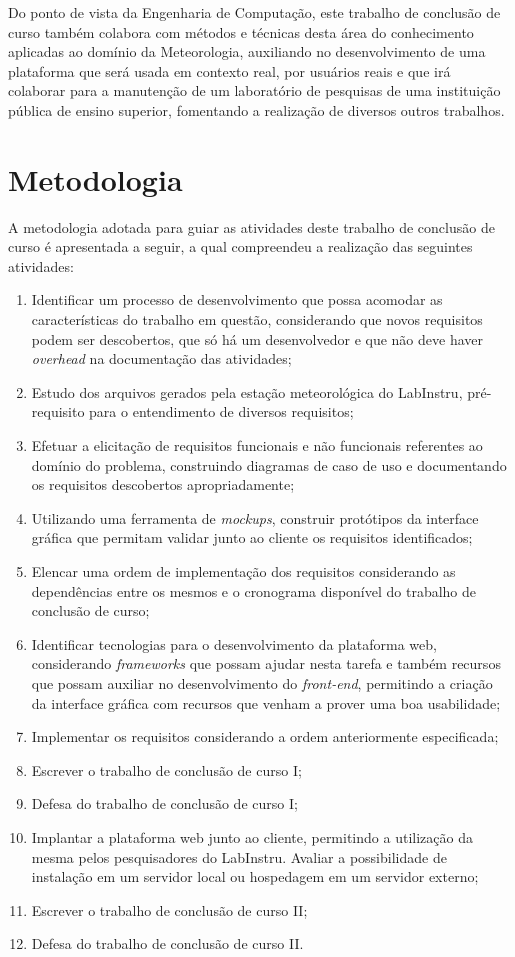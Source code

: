 Do ponto de vista da Engenharia de Computação, este trabalho de conclusão de curso também colabora com métodos e técnicas desta área do conhecimento aplicadas ao domínio da Meteorologia, auxiliando no desenvolvimento de uma plataforma que será usada em contexto real, por usuários reais e que irá colaborar para a manutenção de um laboratório de pesquisas de uma instituição pública de ensino superior, fomentando a realização de diversos outros trabalhos.

\section{Metodologia} \label{sec:metodologia}

A metodologia adotada para guiar as atividades deste trabalho de conclusão de curso é apresentada a seguir, a qual compreendeu a realização das seguintes atividades:

\begin{enumerate}[label=\textbf{Atividade \arabic*}.,leftmargin=*,labelindent=1em]
	\item Identificar um processo de desenvolvimento que possa acomodar as características do trabalho em questão, considerando que novos requisitos podem ser descobertos, que só há um desenvolvedor e que não deve haver \emph{overhead} na documentação das atividades;
	\item Estudo dos arquivos gerados pela estação meteorológica do LabInstru, pré-requisito para o entendimento de diversos requisitos;
	\item Efetuar a elicitação de requisitos funcionais e não funcionais referentes ao domínio do problema, construindo diagramas de caso de uso e documentando os requisitos descobertos apropriadamente;
	\item Utilizando uma ferramenta de \emph{mockups}, construir protótipos da interface gráfica que permitam validar junto ao cliente os requisitos identificados;
	\item Elencar uma ordem de implementação dos requisitos considerando as dependências entre os mesmos e o cronograma disponível do trabalho de conclusão de curso;
	\item Identificar tecnologias para o desenvolvimento da plataforma web, considerando \emph{frameworks} que possam ajudar nesta tarefa e também recursos que possam auxiliar no desenvolvimento do \emph{front-end}, permitindo a criação da interface gráfica com recursos que venham a prover uma boa usabilidade;
	\item Implementar os requisitos considerando a ordem anteriormente especificada;
	\item Escrever o trabalho de conclusão de curso I;
	\item Defesa do trabalho de conclusão de curso I;
	\item Implantar a plataforma web junto ao cliente, permitindo a utilização da mesma pelos pesquisadores do LabInstru. Avaliar a possibilidade de instalação em um servidor local ou hospedagem em um servidor externo;
	\item Escrever o trabalho de conclusão de curso II;
	\item Defesa do trabalho de conclusão de curso II.
\end{enumerate}

